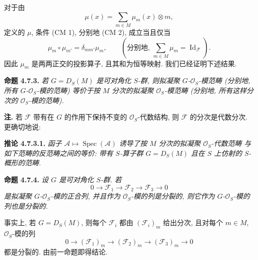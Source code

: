 对于由
\[
  \mu(x)=\sum_{m\in M}\mu_m(x)\otimes m,
\]
定义的 \(\mu\), 条件 (CM 1), 分别地 (CM 2), 成立当且仅当
\[
  \mu_m\circ\mu_{m'}=\delta_{mm'}\mu_m,
  \qquad
  \left(\text{分别地, }\sum_{m\in M}\mu_m
    =\operatorname{Id}_{\mathscr F}\right).
\]
因此 \(\mu_m\) 是两两正交的投影算子, 且其和为恒等映射.
我们已经证明下述结果.

\medskip
\noindent{}\textbf{命题 4.7.3.}
\textit{若 \(G=D_S(M)\) 是可对角化 \(S\)-群, 则拟凝聚
\(G\)-\(\mathcal O_S\)-模范畴 (分别地, 所有
\(G\)-\(\mathcal O_S\)-模的范畴) 等价于按 \(M\) 分次的拟凝聚
\(\mathcal O_S\)-模范畴 (分别地, 所有这样分次的
\(\mathcal O_S\)-模的范畴).}

\medskip
\noindent\textbf{注.}
若 \(\mathscr F\) 带有在 \(G\) 的作用下保持不变的
\(\mathcal O_S\)-代数结构, 则 \(\mathscr F\) 的分次是代数分次.
更确切地说:

\medskip
\noindent{}\textbf{推论 4.7.3.1.}
\textit{函子 \(\mathscr A\mapsto\operatorname{Spec}(\mathscr A)\)
诱导了按 \(M\) 分次的拟凝聚 \(\mathcal O_S\)-代数范畴
与如下范畴的反范畴之间的等价: 带有 \(S\)-算子群
\(G=D_S(M)\) 且在 \(S\) 上仿射的 \(S\)-概形的范畴.}

\medskip
\noindent{}\textbf{命题 4.7.4.}
\textit{设 \(G\) 是可对角化 \(S\)-群. 若
\[
  0\longrightarrow\mathscr F_1\longrightarrow\mathscr F_2
    \longrightarrow\mathscr F_3\longrightarrow0
\]
是拟凝聚 \(G\)-\(\mathcal O_S\)-模的正合列, 并且作为
\(\mathcal O_S\)-模的列是分裂的, 则它作为
\(G\)-\(\mathcal O_S\)-模的列也是分裂的.}

事实上, 若 \(G=D_S(M)\), 则每个 \(\mathscr F_i\) 都由
\((\mathscr F_i)_m\) 给出分次, 且对每个 \(m\in M\),
\(\mathcal O_S\)-模的列
\[
  0\longrightarrow(\mathscr F_1)_m\longrightarrow(\mathscr F_2)_m
    \longrightarrow(\mathscr F_3)_m\longrightarrow0
\]
都是分裂的. 由前一命题即得结论.

